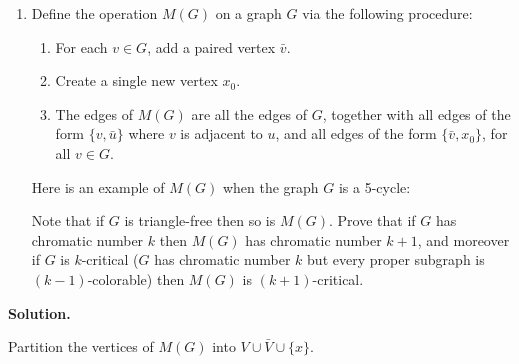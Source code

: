 \documentclass[11pt,letterpaper]{article}
\theoremstyle{definition}
\newcommand{\solution}{\medskip\noindent\textbf{Solution.}\par\medskip}
\begin{document}
\begin{enumerate}[resume]
\item Define the operation $M(G)$ on a graph $G$ via the following procedure:
\begin{enumerate}[label=(\roman*)]
\item For each $v\in G$, add a paired vertex $\bar{v}$.
\item Create a single new vertex $x_0$.
\item The edges of $M(G)$ are all the edges of $G$, together with all edges of the form $\{v,\bar{u}\}$ where $v$ is adjacent to $u$, and all edges of the form $\{\bar{v},x_0\}$, for all $v\in G$.
\end{enumerate}

Here is an example of $M(G)$ when the graph $G$ is a 5-cycle:
\begin{center}
\end{center}

Note that if $G$ is triangle-free then so is $M(G)$. Prove that if $G$ has chromatic number $k$ then $M(G)$ has chromatic number $k+1$, and moreover if $G$ is $k$-critical ($G$ has chromatic number $k$ but every proper subgraph is $(k-1)$-colorable) then $M(G)$ is $(k+1)$-critical.
\end{enumerate}

\solution

Partition the vertices of $M(G)$ into $V\cup \bar{V} \cup\{x\}$.
 
\end{document}
